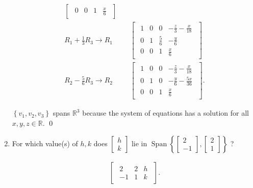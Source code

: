 \documentclass{zc-ust-hw}
\begin{document}
\begin{enumerate}
\begin{align}
\begin{bmatrix}
\begin{array}{ccc|c}
              0 & 0 & 1 & \frac{x}{6}
            \end{array}
          \end{bmatrix} \\
          R_1+\frac{1}{3}R_3\rightarrow R_1
          & \quad
          \begin{bmatrix} 
            \begin{array}{ccc|c}
              1 & 0 & 0 & -\frac{z}{3}-\frac{x}{18} \\
              0 & 1 & \frac{5}{6} & -\frac{y}{6} \\
              0 & 0 & 1 & \frac{x}{6}
            \end{array}
          \end{bmatrix} \\
          R_2-\frac{5}{6}R_3\rightarrow R_2
          & \quad
          \begin{bmatrix} 
            \begin{array}{ccc|c}
              1 & 0 & 0 & -\frac{z}{3}-\frac{x}{18} \\
              0 & 1 & 0 & -\frac{y}{6}-\frac{5x}{36} \\
              0 & 0 & 1 & \frac{x}{6}
            \end{array}
          \end{bmatrix}
        .\end{align}

        $\left\{ v_1,v_2,v_3 \right\}$ spans $\mathbb{R}^3$ because the system of equations has a solution for all $x,y,z\in\mathbb{R}$. \qed

      \item For which value(s) of $h, k$ does $\left[\begin{array}{l}h \\
        k\end{array}\right]$ lie in
        $\operatorname{Span}\left\{\left[\begin{array}{c}2 \\
              -1\end{array}\right],\left[\begin{array}{l}2 \\
        1\end{array}\right]\right\}$ ?

        \begin{align}
          \begin{bmatrix} 
            \begin{array}{cc|c}
              2 & 2 & h \\
              -1 & 1 & k
            \end{array}
          \end{bmatrix}
        .\end{align}


\end{enumerate}
\end{document}
